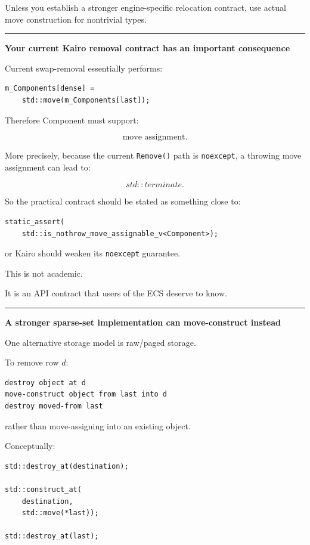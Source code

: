 Unless you establish a stronger engine-specific relocation contract, use actual move construction for nontrivial types.

\begin{center}\rule{0.5\linewidth}{0.5pt}\end{center}

\textbf{Your current Kairo removal contract has an important consequence}

Current swap-removal essentially performs:

\begin{verbatim}
m_Components[dense] =
    std::move(m_Components[last]);
\end{verbatim}

Therefore Component must support:

\[
\text{move assignment}.
\]

More precisely, because the current \texttt{Remove()} path is \texttt{noexcept}, a throwing move assignment can lead to:

\[
std::terminate.
\]

So the practical contract should be stated as something close to:

\begin{verbatim}
static_assert(
    std::is_nothrow_move_assignable_v<Component>);
\end{verbatim}

or Kairo should weaken its \texttt{noexcept} guarantee.

This is not academic.

It is an API contract that users of the ECS deserve to know.

\begin{center}\rule{0.5\linewidth}{0.5pt}\end{center}

\textbf{A stronger sparse-set implementation can move-construct instead}

One alternative storage model is raw/paged storage.

To remove row \(d\):

\begin{verbatim}
destroy object at d
move-construct object from last into d
destroy moved-from last
\end{verbatim}

rather than move-assigning into an existing object.

Conceptually:

\begin{verbatim}
std::destroy_at(destination);

std::construct_at(
    destination,
    std::move(*last));

std::destroy_at(last);
\end{verbatim}

